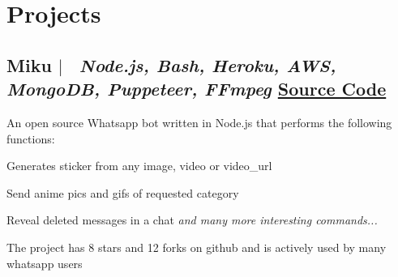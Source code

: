 \documentclass[10pt]{article}
\begin{document}
\section{Projects}

\subsection*{
  Miku 
  $|$
  \normalsize \normalfont \ \textit{Node.js, Bash, Heroku, AWS, MongoDB, Puppeteer, FFmpeg}
  \hfill 
  \normalsize \href{https://github.com/HARSH-SHETH/miku}{Source Code}
}
  An open source Whatsapp bot written in Node.js that performs the following functions: 
  \begin{description}
    \setlength{\itemsep}{0em}
    \setlength{\itemindent}{2\parindent}
    \item[$\bullet$]{Generates sticker from any image, video or video\_url}
    \item[$\bullet$]{ Send anime pics and gifs of requested category}
    \item[$\bullet$]{ Reveal deleted messages in a chat \emph{and many more interesting commands...}}
    \item[$\bullet$]{The project has 8 stars and 12 forks on github and is actively used by many whatsapp users}
  \end{description}

\end{document}
